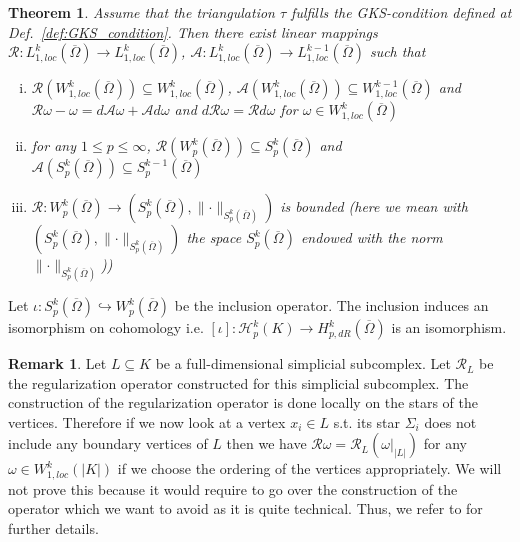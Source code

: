 \documentclass[12pt,a4paper]{article}
\numberwithin{equation}{subsection}
\numberwithin{lemma}{subsection}
\newtheorem{theorem}[lemma]{Theorem}
\theoremstyle{definition}
\newtheorem{remark}[lemma]{Remark}
\newcommand{\aop}{\mathscr{A}}
\newcommand{\lpcoho}{H^k_{p,dR}}
\newcommand{\norm}[2]{\lVert #1 \rVert_{#2}}
\newcommand{\omegabar}{\overline{\Omega}}
\newcommand{\rop}{\mathscr{R}} %
\begin{document}
\begin{theorem}\label{thm:operators}
    Assume that the triangulation $\tau$ fulfills the GKS-condition 
    defined at Def.~\ref{def:GKS_condition}.
    Then there exist linear mappings 
    $\mathscr{R}: L^k_{1,loc}(\omegabar) \rightarrow 
    L^k_{1,loc}(\omegabar)$, $\mathscr{A}: L^k_{1,loc}(\omegabar) 
    \rightarrow L^{k-1}_{1,loc}(\omegabar)$ 
    such that
    \begin{enumerate}[(i)]
        \item $\rop(W^k_{1,loc}(\omegabar)) \subseteq W^k_{1,loc}(\omegabar)$,
            $\aop(W^k_{1,loc}(\omegabar)) \subseteq W^{k-1}_{1,loc}(\omegabar)$
            and $\mathscr{R}\omega - \omega = 
            d\mathscr{A}\omega + \mathscr{A}d\omega$ and 
            $d\rop \omega  = \rop d \omega$ for 
            $\omega \in W^k_{1,loc}(\omegabar)$
        \item for any $1 \leq p \leq \infty$, 
            $\rop(W^k_p(\omegabar)) \subseteq S^k_p(\omegabar)$ and
            $\aop(S^k_p(\omegabar)) \subseteq S^{k-1}_p(\omegabar)$
        \item $\rop: W^k_p(\omegabar) \rightarrow 
            (S^k_p(\omegabar),\norm{\cdot}{S^k_p(\omegabar)})$ is bounded (here
            we mean with $(S^k_p(\omegabar),\norm{\cdot}{S^k_p(\omegabar)})$ 
            the space $S^k_p(\omegabar)$ endowed with the norm 
            $\norm{\cdot}{S^k_p(\omegabar)}$))
    \end{enumerate}
\end{theorem}

Let 
$\iota: S^k_p(\omegabar) \hookrightarrow W^k_p(\omegabar)$ be the inclusion operator. 
The inclusion induces an
isomorphism on cohomology \cite[Lemma 4, Corollary]{goldshtein} i.e. 
$[\iota]: \mathscr{H}_p^k(K) \rightarrow \lpcoho(\omegabar)$ is an isomorphism. 


\begin{remark}
    Let $L \subseteq K$ be a full-dimensional %
    simplicial subcomplex. Let $\rop_L$ be the regularization operator 
    constructed for this simplicial subcomplex. The construction of the
    regularization operator is done locally on the stars of the vertices. %
    Therefore if we now look at a vertex $x_i \in L$ s.t. its star 
    $\Sigma_i$ does not include any boundary vertices of $L$ then we have 
    $\rop \omega = \rop_L(\omega|_{|L|})$ for any $\omega \in W^k_{1,loc}(|K|)$
    if we choose the ordering of the vertices appropriately.
    We will not prove this because it would require to go over the construction
    of the operator which we want to avoid as it is quite technical. Thus, 
    we refer to \cite[Sec.\,2]{goldshtein} for further details.
\end{remark}
\end{document}
